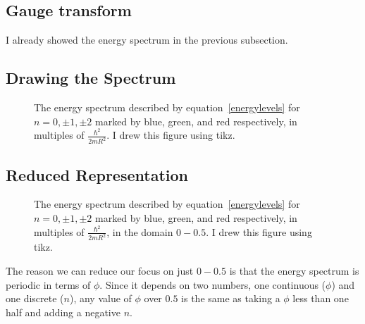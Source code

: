 \subsection{Gauge transform}
I already showed the energy spectrum in the previous subsection.
\newpage
\subsection{Drawing the Spectrum}
\begin{figure}[!htb]
	\centering
	\caption{The energy spectrum described by equation~\ref{energylevels} for \(n=0,\pm 1, \pm 2\) marked by blue, green, and red respectively, in multiples of \(\frac{\hbar^2}{2mR^2}\). I drew this figure using tikz.}
\end{figure}
\subsection{Reduced Representation}
\begin{figure}[!htb]
	\centering
	\caption{The energy spectrum described by equation~\ref{energylevels} for \(n=0,\pm 1, \pm 2\) marked by blue, green, and red respectively, in multiples of \(\frac{\hbar^2}{2mR^2}\), in the domain \(0-0.5\). I drew this figure using tikz.}
\end{figure}

The reason we can reduce our focus on just \(0-0.5\) is that the energy spectrum is periodic in terms of \(\phi\). Since it depends on two numbers, one continuous (\(\phi\)) and one discrete (\(n\)), any value of \(\phi\) over \(0.5\) is the same as taking a \(\phi\) less than one half and adding a negative \(n\).
